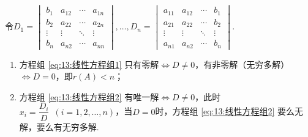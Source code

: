 \begin{theorem}
    令$D_1=\begin{vmatrix}
            b_1    & a_{12} & \cdots & a_{1n} \\
            b_2    & a_{22} & \cdots & a_{2n} \\
            \vdots & \vdots & \ddots & \vdots \\
            b_n    & a_{n2} & \cdots & a_{nn}
        \end{vmatrix},\ldots,D_n=\begin{vmatrix}
            a_{11} & a_{12} & \cdots & b_1    \\
            a_{21} & a_{22} & \cdots & b_2    \\
            \vdots & \vdots & \ddots & \vdots \\
            a_{n1} & a_{n2} & \cdots & b_n
        \end{vmatrix}$.

    \begin{enumerate}
        \item 方程组 \ref{eq:13:线性方程组1} 只有零解$\iff D \neq 0$，有非零解（无穷多解）$\iff D=0$，即$r(A)<n$；

        \item 方程组 \ref{eq:13:线性方程组2} 有唯一解$\iff D \neq 0$，此时$x_i=\dfrac{D_i}{D}\enspace(i=1,2,\ldots,n)$，当$D=0$时，方程组 \ref{eq:13:线性方程组2} 要么无解，要么有无穷多解.
    \end{enumerate}
\end{theorem}

